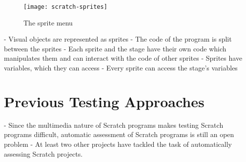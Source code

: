 \begin{wrapfigure}{r}{0.45\textwidth + 5mm}
    \centering
    \vspace{-4mm}
    \texttt{[image: scratch-sprites]}
    \caption{The sprite menu}
    \label{fig:the_sprite_menu}
\end{wrapfigure}
- Visual objects are represented as sprites
- The code of the program is split between the sprites
- Each sprite and the stage have their own code which manipulates them and can interact with the code of other sprites
- Sprites have variables, which they can access
- Every sprite can access the stage's variables
\parspace

%

\section{Previous Testing Approaches}

- Since the multimedia nature of Scratch programs makes testing Scratch programs difficult,
  automatic assessment of Scratch programs is still an open problem
- At least two other projects have tackled the task of automatically assessing Scratch projects.


